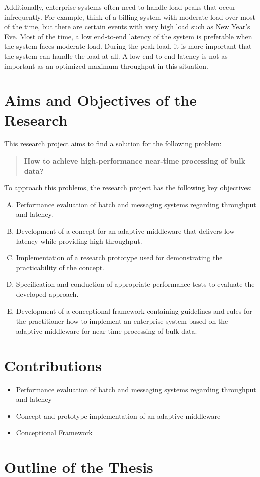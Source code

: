 Additionally, enterprise systems often need to handle load peaks that occur infrequently. For example, think of a billing system with moderate load over most of the time, but there are certain events with very high load such as New Year's Eve. Most of the time, a low end-to-end latency of the system is preferable when the system faces moderate load. During the peak load, it is more important that the system can handle the load at all. A low end-to-end latency is not as important as an optimized maximum throughput in this situation.

\section{Aims and Objectives of the Research}\label{sec:research_objectives}
This research project aims to find a solution for the following problem:
\begin{quote}
\textbf{How to achieve high-performance near-time processing of bulk data?}
\end{quote}
To approach this problems, the research project has the following key objectives:
\begin{enumerate}[A.]
	\item Performance evaluation of batch and messaging systems regarding throughput and latency.
	\item Development of a concept for an adaptive middleware that delivers low latency while providing high throughput.
	\item Implementation of a research prototype used for demonstrating the practicability of the concept.
	\item Specification and conduction of appropriate performance tests to evaluate the developed approach.
	\item Development of a conceptional framework containing guidelines and rules for the practitioner how to implement an enterprise system based on the adaptive middleware for near-time processing of bulk data.
\end{enumerate}

\section{Contributions}\label{sec:contributions}

\begin{itemize}
	\item Performance evaluation of batch and messaging systems regarding throughput and latency
	\item Concept and prototype implementation of an adaptive middleware 
	\item Conceptional Framework
\end{itemize}

\section{Outline of the Thesis}\label{sec:thesis_outline}